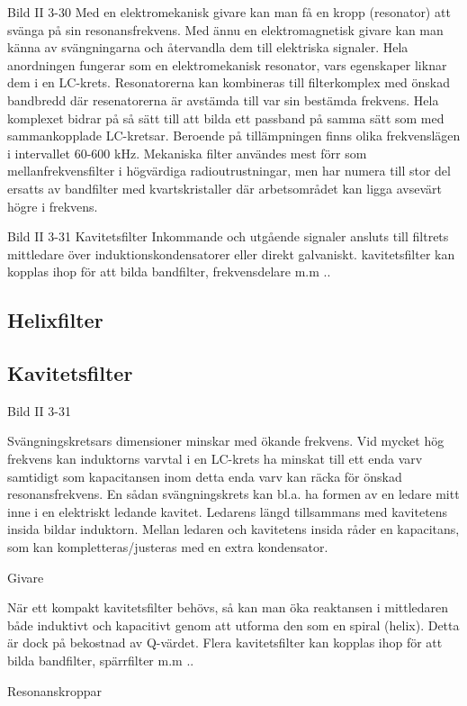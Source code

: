 {Bild II 3-30
Med en elektromekanisk givare kan man få
en kropp (resonator) att svänga på sin resonansfrekvens. Med ännu en elektromagnetisk givare kan man känna av svängningarna och återvandla dem till elektriska signaler. Hela anordningen fungerar som en elektromekanisk resonator, vars egenskaper liknar dem i en LC-krets.
Resonatorerna kan kombineras till filterkomplex med önskad bandbredd där resenatorerna är avstämda till var sin bestämda frekvens. Hela komplexet bidrar på så
sätt till att bilda ett passband på samma sätt
som med sammankopplade LC-kretsar.
Beroende på tillämpningen finns olika frekvenslägen i intervallet 60-600 kHz.
Mekaniska filter användes mest förr som
mellanfrekvensfilter i högvärdiga radioutrustningar, men har numera till stor del ersatts
av bandfilter med kvartskristaller där arbetsområdet kan ligga avsevärt högre i frekvens.

Bild II 3-31 Kavitetsfilter
Inkommande och utgående signaler ansluts till filtrets mittledare över induktionskondensatorer eller direkt galvaniskt.
kavitetsfilter kan kopplas ihop för att
bilda bandfilter, frekvensdelare m.m ..

\subsection{Helixfilter}

\subsection{Kavitetsfilter}
Bild II 3-31

Svängningskretsars dimensioner minskar
med ökande frekvens. Vid mycket hög frekvens kan induktorns varvtal i en LC-krets ha
minskat till ett enda varv samtidigt som kapacitansen inom detta enda varv kan räcka
för önskad resonansfrekvens.
En sådan svängningskrets kan bl.a. ha
formen av en ledare mitt inne i en elektriskt
ledande kavitet. Ledarens längd tillsammans
med kavitetens insida bildar induktorn. Mellan ledaren och kavitetens insida råder en
kapacitans, som kan kompletteras/justeras
med en extra kondensator.

Givare

När ett kompakt kavitetsfilter behövs, så kan
man öka reaktansen i mittledaren både induktivt och kapacitivt genom att utforma den
som en spiral (helix). Detta är dock på bekostnad av Q-värdet. Flera kavitetsfilter kan
kopplas ihop för att bilda bandfilter, spärrfilter m.m ..

Resonanskroppar

}
